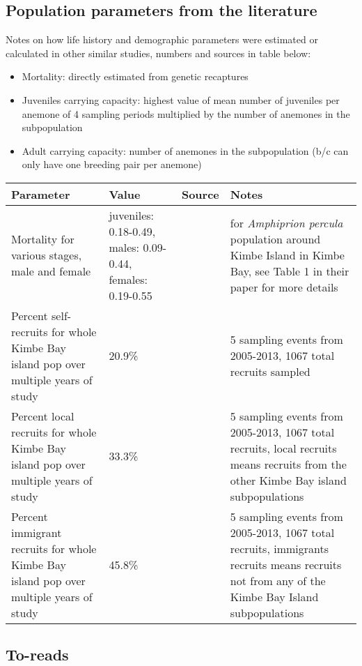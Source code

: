 \documentclass[12pt, oneside]{article}   	%
\begin{document}
\subsection*{Population parameters from the literature}
Notes on how life history and demographic parameters were estimated or calculated in other similar studies, numbers and sources in table below:
\begin{itemize}
\item Mortality: directly estimated from genetic recaptures \citep{salles_coral_2015}
\item Juveniles carrying capacity: highest value of mean number of juveniles per anemone of 4 sampling periods multiplied by the number of anemones in the subpopulation \citep{salles_coral_2015}
\item Adult carrying capacity: number of anemones in the subpopulation (b/c can only have one breeding pair per anemone) \citep{salles_coral_2015}
\end{itemize}

\begin{longtable} { |p{1.5in}|p{1.0in}|p{1.5in}|p{1.5in}| } 
\hline{}
\textbf{Parameter} & \textbf{Value} & \textbf{Source} & \textbf{Notes} \\ \hline
Mortality for various stages, male and female & juveniles: 0.18-0.49, males: 0.09-0.44, females: 0.19-0.55 & \citep{salles_coral_2015} & for \textit{Amphiprion percula} population around Kimbe Island in Kimbe Bay, see Table 1 in their paper for more details \\ \hline
Percent self-recruits for whole Kimbe Bay island pop over multiple years of study & 20.9\% & \citep{salles_coral_2015} & 5 sampling events from 2005-2013, 1067 total recruits sampled \\ \hline
Percent local recruits for whole Kimbe Bay island pop over multiple years of study & 33.3\% & \citep{salles_coral_2015} & 5 sampling events from 2005-2013, 1067 total recruits, local recruits means recruits from the other Kimbe Bay island subpopulations \\ \hline
Percent immigrant recruits for whole Kimbe Bay island pop over multiple years of study & 45.8\%  & \citep{salles_coral_2015} & 5 sampling events from 2005-2013, 1067 total recruits, immigrants recruits means recruits not from any of the Kimbe Bay Island subpopulations \\ \hline
\end{longtable}

\subsection*{To-reads}
\end{document}
